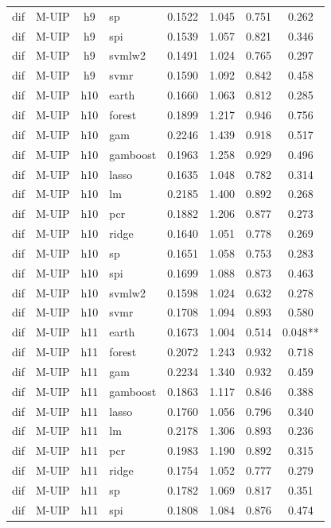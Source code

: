 \begin{ThreePartTable}
\begin{longtable}[t]{llclcccc}
dif & M-UIP & h9 & sp & 0.1522 & 1.045 & 0.751 & 0.262\\
dif & M-UIP & h9 & spi & 0.1539 & 1.057 & 0.821 & 0.346\\
dif & M-UIP & h9 & svmlw2 & 0.1491 & 1.024 & 0.765 & 0.297\\
dif & M-UIP & h9 & svmr & 0.1590 & 1.092 & 0.842 & 0.458\\
\addlinespace
dif & M-UIP & h10 & earth & 0.1660 & 1.063 & 0.812 & 0.285\\
dif & M-UIP & h10 & forest & 0.1899 & 1.217 & 0.946 & 0.756\\
dif & M-UIP & h10 & gam & 0.2246 & 1.439 & 0.918 & 0.517\\
dif & M-UIP & h10 & gamboost & 0.1963 & 1.258 & 0.929 & 0.496\\
dif & M-UIP & h10 & lasso & 0.1635 & 1.048 & 0.782 & 0.314\\
dif & M-UIP & h10 & lm & 0.2185 & 1.400 & 0.892 & 0.268\\
dif & M-UIP & h10 & pcr & 0.1882 & 1.206 & 0.877 & 0.273\\
dif & M-UIP & h10 & ridge & 0.1640 & 1.051 & 0.778 & 0.269\\
dif & M-UIP & h10 & sp & 0.1651 & 1.058 & 0.753 & 0.283\\
dif & M-UIP & h10 & spi & 0.1699 & 1.088 & 0.873 & 0.463\\
dif & M-UIP & h10 & svmlw2 & 0.1598 & 1.024 & 0.632 & 0.278\\
dif & M-UIP & h10 & svmr & 0.1708 & 1.094 & 0.893 & 0.580\\
\addlinespace
dif & M-UIP & h11 & earth & 0.1673 & 1.004 & 0.514 & 0.048**\\
dif & M-UIP & h11 & forest & 0.2072 & 1.243 & 0.932 & 0.718\\
dif & M-UIP & h11 & gam & 0.2234 & 1.340 & 0.932 & 0.459\\
dif & M-UIP & h11 & gamboost & 0.1863 & 1.117 & 0.846 & 0.388\\
dif & M-UIP & h11 & lasso & 0.1760 & 1.056 & 0.796 & 0.340\\
dif & M-UIP & h11 & lm & 0.2178 & 1.306 & 0.893 & 0.236\\
dif & M-UIP & h11 & pcr & 0.1983 & 1.190 & 0.892 & 0.315\\
dif & M-UIP & h11 & ridge & 0.1754 & 1.052 & 0.777 & 0.279\\
dif & M-UIP & h11 & sp & 0.1782 & 1.069 & 0.817 & 0.351\\
dif & M-UIP & h11 & spi & 0.1808 & 1.084 & 0.876 & 0.474\\

\end{longtable}
\end{ThreePartTable}
